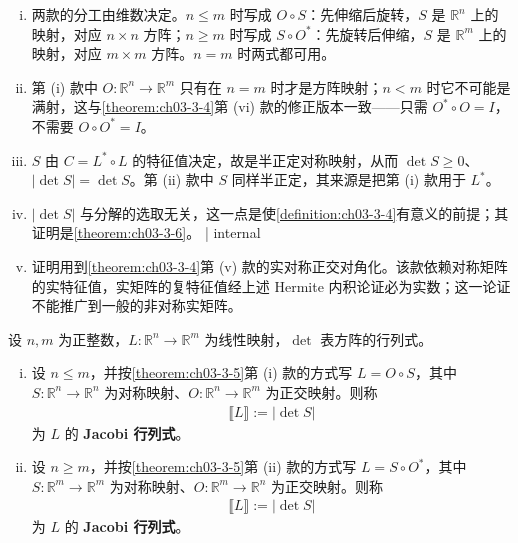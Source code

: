 \documentclass[../../main.tex]{subfiles}%
\begin{document}
\begin{remark}\label{remark:ch03-thm-3-5-条件}
\begin{enumerate}[(i)]
\item 两款的分工由维数决定。$n\leqslant m$ 时写成 $O\circ S$：先伸缩后旋转，$S$ 是 $\mathbb{R}^n$ 上的映射，对应 $n\times n$ 方阵；$n\geqslant m$ 时写成 $S\circ O^*$：先旋转后伸缩，$S$ 是 $\mathbb{R}^m$ 上的映射，对应 $m\times m$ 方阵。$n=m$ 时两式都可用。
\item 第 (i) 款中 $O:\mathbb{R}^n\to\mathbb{R}^m$ 只有在 $n=m$ 时才是方阵映射；$n<m$ 时它不可能是满射，这与\cref{theorem:ch03-3-4}第 (vi) 款的修正版本一致——只需 $O^*\circ O=I$，不需要 $O\circ O^*=I$。%
\item $S$ 由 $C=L^*\circ L$ 的特征值决定，故是半正定对称映射，从而 $\det S\geqslant0$、$\lvert\det S\rvert=\det S$。第 (ii) 款中 $S$ 同样半正定，其来源是把第 (i) 款用于 $L^*$。
\item $\lvert\det S\rvert$ 与分解的选取无关，这一点是使\cref{definition:ch03-3-4}有意义的前提；其证明是\cref{theorem:ch03-3-6}。 | internal %
\item 证明用到\cref{theorem:ch03-3-4}第 (v) 款的实对称正交对角化。该款依赖对称矩阵的实特征值，实矩阵的复特征值经上述 Hermite 内积论证必为实数；这一论证不能推广到一般的非对称实矩阵。%
\end{enumerate}
\end{remark}

\begin{definition}\label{definition:ch03-3-4}
设 $n,m$ 为正整数，$L:\mathbb{R}^n\to\mathbb{R}^m$ 为线性映射，$\det$ 表方阵的行列式。
\begin{enumerate}[(i)]
\item 设 $n\leqslant m$，并按\cref{theorem:ch03-3-5}第 (i) 款的方式写 $L=O\circ S$，其中 $S:\mathbb{R}^n\to\mathbb{R}^n$ 为对称映射、$O:\mathbb{R}^n\to\mathbb{R}^m$ 为正交映射。则称%
\begin{align*}
\llbracket L\rrbracket:=\lvert\det S\rvert
\end{align*}
为 $L$ 的 \textbf{Jacobi 行列式}。
\item 设 $n\geqslant m$，并按\cref{theorem:ch03-3-5}第 (ii) 款的方式写 $L=S\circ O^*$，其中 $S:\mathbb{R}^m\to\mathbb{R}^m$ 为对称映射、$O:\mathbb{R}^m\to\mathbb{R}^n$ 为正交映射。则称%
\begin{align*}
\llbracket L\rrbracket:=\lvert\det S\rvert
\end{align*}
为 $L$ 的 \textbf{Jacobi 行列式}。
\end{enumerate}
\end{definition}
\end{document}
